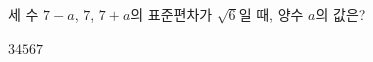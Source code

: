 세 수 $7-a$, $7$, $7+a$의 표준편차가 $\sqrt{6}$일 때, 양수 $a$의 값은?
\begin{choices32}{$3$}{$4$}{$5$}{$6$}{$7$}\end{choices32}
